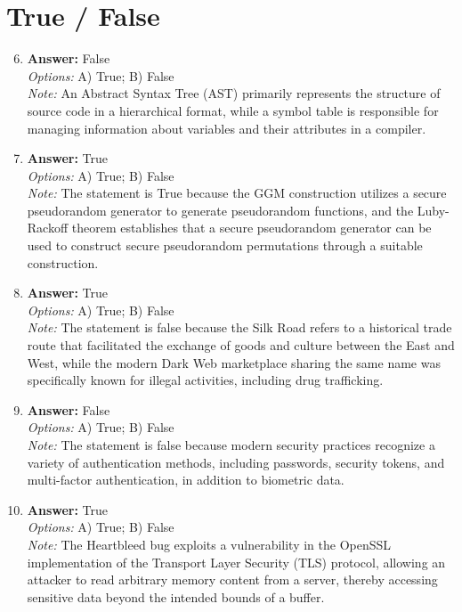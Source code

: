 \documentclass[12pt]{article}
\begin{document}
\section*{True / False}
\begin{enumerate}[label=\arabic*.]
\setcounter{enumi}{5}
\item \textbf{Answer:} False
\\ \textit{Options:} A) True; B) False
\\ \textit{Note:} An Abstract Syntax Tree (AST) primarily represents the structure of source code in a hierarchical format, while a symbol table is responsible for managing information about variables and their attributes in a compiler.
\item \textbf{Answer:} True
\\ \textit{Options:} A) True; B) False
\\ \textit{Note:} The statement is True because the GGM construction utilizes a secure pseudorandom generator to generate pseudorandom functions, and the Luby-Rackoff theorem establishes that a secure pseudorandom generator can be used to construct secure pseudorandom permutations through a suitable construction.
\item \textbf{Answer:} True
\\ \textit{Options:} A) True; B) False
\\ \textit{Note:} The statement is false because the Silk Road refers to a historical trade route that facilitated the exchange of goods and culture between the East and West, while the modern Dark Web marketplace sharing the same name was specifically known for illegal activities, including drug trafficking.
\item \textbf{Answer:} False
\\ \textit{Options:} A) True; B) False
\\ \textit{Note:} The statement is false because modern security practices recognize a variety of authentication methods, including passwords, security tokens, and multi-factor authentication, in addition to biometric data.
\item \textbf{Answer:} True
\\ \textit{Options:} A) True; B) False
\\ \textit{Note:} The Heartbleed bug exploits a vulnerability in the OpenSSL implementation of the Transport Layer Security (TLS) protocol, allowing an attacker to read arbitrary memory content from a server, thereby accessing sensitive data beyond the intended bounds of a buffer.
\end{enumerate}
\end{document}

